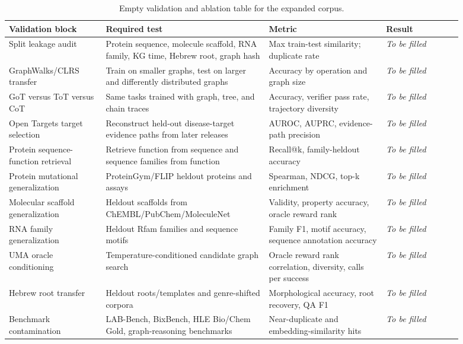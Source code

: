 \documentclass[11pt]{article}
\newcommand{\1}{\mathbf{1}}
\begin{document}
{\scriptsize
\setlength{\tabcolsep}{3pt}
\begin{longtable}{p{0.19\linewidth}p{0.32\linewidth}p{0.23\linewidth}p{0.15\linewidth}}
\caption{Empty validation and ablation table for the expanded corpus.}\\
\toprule
Validation block & Required test & Metric & Result \\
\midrule
\endhead
Split leakage audit & Protein sequence, molecule scaffold, RNA family, KG time, Hebrew root, graph hash & Max train-test similarity; duplicate rate & \emph{To be filled} \\
GraphWalks/CLRS transfer & Train on smaller graphs, test on larger and differently distributed graphs & Accuracy by operation and graph size & \emph{To be filled} \\
GoT versus ToT versus CoT & Same tasks trained with graph, tree, and chain traces & Accuracy, verifier pass rate, trajectory diversity & \emph{To be filled} \\
Open Targets target selection & Reconstruct held-out disease-target evidence paths from later releases & AUROC, AUPRC, evidence-path precision & \emph{To be filled} \\
Protein sequence-function retrieval & Retrieve function from sequence and sequence families from function & Recall@k, family-heldout accuracy & \emph{To be filled} \\
Protein mutational generalization & ProteinGym/FLIP heldout proteins and assays & Spearman, NDCG, top-k enrichment & \emph{To be filled} \\
Molecular scaffold generalization & Heldout scaffolds from ChEMBL/PubChem/MoleculeNet & Validity, property accuracy, oracle reward rank & \emph{To be filled} \\
RNA family generalization & Heldout Rfam families and sequence motifs & Family F1, motif accuracy, sequence annotation accuracy & \emph{To be filled} \\
UMA oracle conditioning & Temperature-conditioned candidate graph search & Oracle reward rank correlation, diversity, calls per success & \emph{To be filled} \\
Hebrew root transfer & Heldout roots/templates and genre-shifted corpora & Morphological accuracy, root recovery, QA F1 & \emph{To be filled} \\
Benchmark contamination & LAB-Bench, BixBench, HLE Bio/Chem Gold, graph-reasoning benchmarks & Near-duplicate and embedding-similarity hits & \emph{To be filled} \\
\bottomrule
\end{longtable}}
\end{document}

